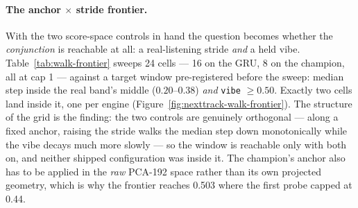 \documentclass[11pt]{article}
\begin{document}
\paragraph{The anchor $\times$ stride frontier.} With the two score-space
controls in hand the question becomes whether the \emph{conjunction} is
reachable at all: a real-listening stride \emph{and} a held vibe.
Table~\ref{tab:walk-frontier} sweeps \num{24} cells --- \num{16} on the GRU,
\num{8} on the champion, all at cap 1 --- against a target window
pre-registered before the sweep: median step inside the real band's middle
($\numrange{0.20}{0.38}$) \emph{and} \texttt{vibe} $\ge\num{0.50}$. Exactly two
cells land inside it, one per engine (Figure~\ref{fig:nexttrack-walk-frontier}).
The structure of the grid is the finding: the two controls are genuinely
orthogonal --- along a fixed anchor, raising the stride walks the median step
down monotonically while the vibe decays much more slowly --- so the window is
reachable only with both on, and neither shipped configuration was inside it.
The champion's anchor also has to be applied in the \emph{raw} PCA-192 space
rather than its own projected geometry, which is why the frontier reaches
\num{0.503} where the first probe capped at \num{0.44}.
\end{document}

